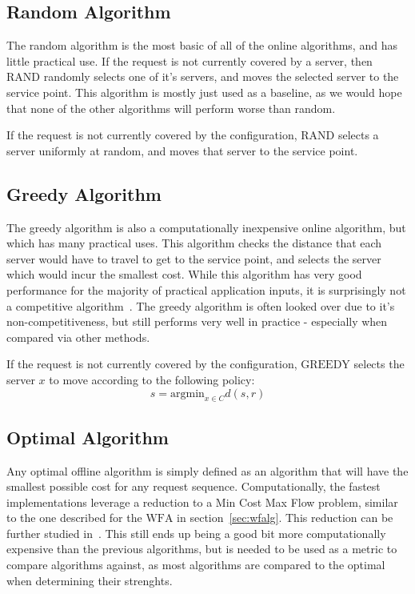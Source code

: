
\subsection{Random Algorithm}
\label{sec:rand}
The random algorithm is the most basic of all of the online algorithms, and has little practical use. If the request is not currently covered by a server, then $\mathrm{RAND}$ randomly selects one of it's servers, and moves the selected server to the service point. This algorithm is mostly just used as a baseline, as we would hope that none of the other algorithms will perform worse than random.

\begin{definition}
    If the request is not currently covered by the configuration, $\mathrm{RAND}$ selects a server uniformly at random, and moves that server to the service point.
\end{definition}

\subsection{Greedy Algorithm}
\label{sec:greedy}
The greedy algorithm is also a computationally inexpensive online algorithm, but which has many practical uses. This algorithm checks the distance that each server would have to travel to get to the service point, and selects the server which would incur the smallest cost. While this algorithm has very good performance for the majority of practical application inputs, it is surprisingly not a competitive algorithm~\cite{OnlineComp1998}. The greedy algorithm is often looked over due to it's non-competitiveness, but still performs very well in practice - especially when compared via other methods.

\begin{definition}
    If the request is not currently covered by the configuration, $\mathrm{GREEDY}$ selects the server $x$ to move according to the following policy:
    \begin{equation*}
        s = \mathrm{argmin}_{x \in C} d(s, r)
    \end{equation*}
\end{definition}

\subsection{Optimal Algorithm}
\label{sec:OPT}
Any optimal offline algorithm is simply defined as an algorithm that will have the smallest possible cost for any request sequence. Computationally, the fastest implementations leverage a reduction to a Min Cost Max Flow problem, similar to the one described for the $\mathrm{WFA}$ in section~\ref{sec:wfalg}. This reduction can be further studied in~\cite{WFA2009}. This still ends up being a good bit more computationally expensive than the previous algorithms, but is needed to be used as a metric to compare algorithms against, as most algorithms are compared to the optimal when determining their strenghts.

